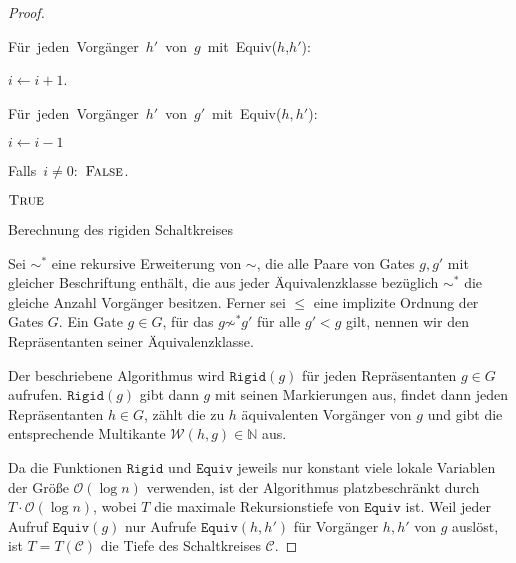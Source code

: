 \begin{proof}
\begin{algorithm}
\begin{lyxcode}
\begin{lyxcode}
\begin{lyxcode}
Für~jeden~Vorgänger~$h'$~von~$g$~mit~Equiv($h$,$h'$):~

\begin{lyxcode}
$i\leftarrow i+1$.
\end{lyxcode}
Für~jeden~Vorgänger~$h'$~von~$g'$~mit~Equiv($h,h'$):~

\begin{lyxcode}
$i\leftarrow i-1$
\end{lyxcode}
Falls~$i\neq0$:~$\textsc{False}$.
\end{lyxcode}
$\textsc{True}$
\end{lyxcode}
\end{lyxcode}
\caption{\label{alg:rigid}Berechnung des rigiden Schaltkreises}
\end{algorithm}

Sei $\sim^{*}$ eine rekursive Erweiterung von $\sim$, die alle Paare
von Gates $g,g'$ mit gleicher Beschriftung enthält, die aus jeder
Äquivalenzklasse bezüglich $\sim^{*}$ die gleiche Anzahl Vorgänger
besitzen. Ferner sei $\leqslant$ eine implizite Ordnung der Gates
$G$. Ein Gate $g\in G$, für das $g\not\sim^{*}g'$ für alle $g'<g$
gilt, nennen wir den Repräsentanten seiner Äquivalenzklasse.

Der beschriebene Algorithmus wird $\mathtt{Rigid}\left(g\right)$
für jeden Repräsentanten $g\in G$ aufrufen. $\mathtt{Rigid}\left(g\right)$
gibt dann $g$ mit seinen Markierungen aus, findet dann jeden Repräsentanten
$h\in G$, zählt die zu $h$ äquivalenten Vorgänger von $g$ und gibt
die entsprechende Multikante $\mathcal{W}\left(h,g\right)\in\mathbb{N}$
aus.

Da die Funktionen $\mathtt{Rigid}$ und $\mathtt{Equiv}$ jeweils
nur konstant viele lokale Variablen der Größe $\mathcal{O}\left(\log n\right)$
verwenden, ist der Algorithmus platzbeschränkt durch $T\cdot\mathcal{O}\left(\log n\right)$,
wobei $T$ die maximale Rekursionstiefe von $\mathtt{Equiv}$ ist.
Weil jeder Aufruf $\mathtt{Equiv}\left(g\right)$ nur Aufrufe $\mathtt{Equiv}\left(h,h'\right)$
für Vorgänger $h,h'$ von $g$ auslöst, ist $T=T\left(\mathcal{C}\right)$
die Tiefe des Schaltkreises $\mathcal{C}$.
\end{proof}


